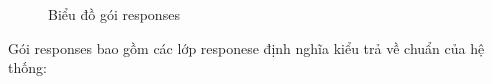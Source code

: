 \documentclass[../DoAn.tex]{subfiles}
\begin{document}
\begin{figure}[H]
    \centering
    \caption{Biểu đồ gói responses}
    \label{fig:Fig7}
\end{figure}
Gói responses  bao gồm các lớp responese định nghĩa kiểu trả về chuẩn của hệ thống:
\end{document}

